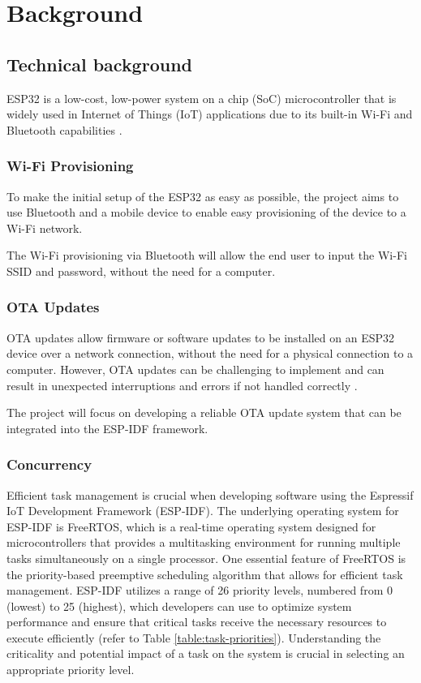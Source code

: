 \section{Background}
\label{sec:background}

\subsection{Technical background}
\label{sec:technical}
ESP32 is a low-cost, low-power system on a chip (SoC) microcontroller that is widely used in Internet of Things (IoT) applications due to its built-in Wi-Fi and Bluetooth capabilities \cite{espressif:popularity} \cite{espressif:esp32_datasheet}.

\subsubsection{Wi-Fi Provisioning}
\label{subsec:bluetooth}
To make the initial setup of the ESP32 as easy as possible, the project aims to use Bluetooth and a mobile device to enable easy provisioning of the device to a Wi-Fi network.

The Wi-Fi provisioning via Bluetooth will allow the end user to input the Wi-Fi SSID and password, without the need for a computer.

\subsubsection{OTA Updates}
\label{subsec:ota}
OTA updates allow firmware or software updates to be installed on an ESP32 device over a network connection, without the need for a physical connection to a computer. However, OTA updates can be challenging to implement and can result in unexpected interruptions and errors if not handled correctly \cite{Arakadakis:2021}.

The project will focus on developing a reliable OTA update system that can be integrated into the ESP-IDF framework.

\subsubsection{Concurrency}
\label{subsec:concurrency}
Efficient task management is crucial when developing software using the Espressif IoT Development Framework (ESP-IDF). The underlying operating system for ESP-IDF is FreeRTOS, which is a real-time operating system designed for microcontrollers that provides a multitasking environment for running multiple tasks simultaneously on a single processor. One essential feature of FreeRTOS is the priority-based preemptive scheduling algorithm that allows for efficient task management. ESP-IDF utilizes a range of 26 priority levels, numbered from 0 (lowest) to 25 (highest), which developers can use to optimize system performance and ensure that critical tasks receive the necessary resources to execute efficiently (refer to Table \ref{table:task-priorities}). Understanding the criticality and potential impact of a task on the system is crucial in selecting an appropriate priority level.
